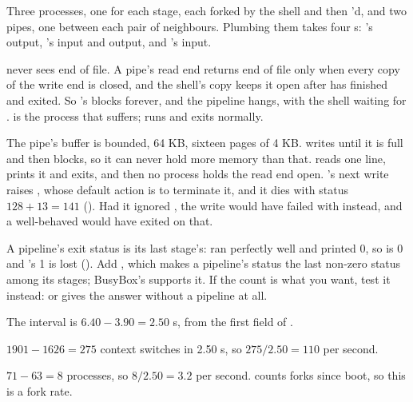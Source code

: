 
 Three processes, one for each stage, each forked by the shell and then 'd, and
two pipes, one between each pair of neighbours. Plumbing them takes four s: 's
output, 's input and output, and 's input.

  never sees end of file. A pipe's read end returns end of file only when every
copy of the write end is closed, and the shell's copy keeps it open after  has finished and
exited. So 's  blocks forever, and the pipeline hangs, with the shell waiting for
.  is the process that suffers;  runs and exits normally.

 The pipe's buffer is bounded, 64 KB, sixteen pages of 4 KB.  writes until it is
full and then blocks, so it can never hold more memory than that.  reads one line,
prints it and exits, and then no process holds the read end open. 's next write raises
, whose default action is to terminate it, and it dies with status $128 + 13 = 141$
(). Had it ignored , the write would have failed with 
instead, and a well-behaved  would have exited on that.

 A pipeline's exit status is its last stage's:  ran perfectly well and printed
0, so  is 0 and 's 1 is lost (). Add ,
which makes a pipeline's status the last non-zero status among its stages; BusyBox's 
supports it. If the count is what you want, test it instead:  or  gives
the answer without a pipeline at all.


The interval is $6.40 - 3.90 = 2.50$ s, from the first field of .

 $1901 - 1626 = 275$ context switches in 2.50 s, so $275 / 2.50 = 110$ per second.

 $71 - 63 = 8$ processes, so $8 / 2.50 = 3.2$ per second.  counts forks
since boot, so this is a fork rate.

